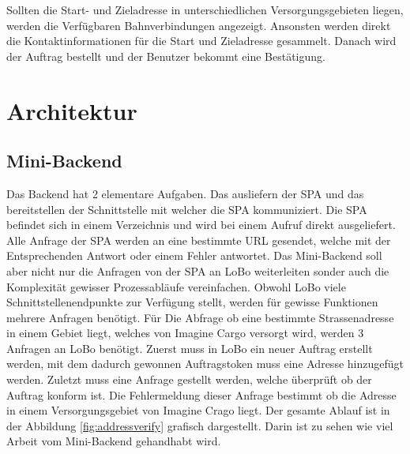 Sollten die Start- und Zieladresse in unterschiedlichen Versorgungsgebieten liegen, werden die Verfügbaren Bahnverbindungen angezeigt. Ansonsten werden direkt die Kontaktinformationen für die Start und Zieladresse gesammelt. Danach wird der Auftrag bestellt und der Benutzer bekommt eine Bestätigung.


\section{Architektur}

\subsection{Mini-Backend}
Das Backend hat 2 elementare Aufgaben. Das ausliefern der SPA und das bereitstellen der Schnittstelle mit welcher die SPA kommuniziert. Die SPA befindet sich in einem Verzeichnis und wird bei einem Aufruf direkt ausgeliefert. Alle Anfrage der SPA werden an eine bestimmte URL gesendet, welche mit der Entsprechenden Antwort oder einem Fehler antwortet. Das Mini-Backend soll aber nicht nur die Anfragen von der SPA an LoBo weiterleiten sonder auch die Komplexität gewisser Prozessabläufe vereinfachen. Obwohl LoBo viele Schnittstellenendpunkte zur Verfügung stellt, werden für gewisse Funktionen mehrere Anfragen benötigt. Für Die Abfrage ob eine bestimmte Strassenadresse in einem Gebiet liegt, welches von Imagine Cargo versorgt wird, werden 3 Anfragen an LoBo benötigt. Zuerst muss in LoBo ein neuer Auftrag erstellt werden, mit dem dadurch gewonnen Auftragstoken muss eine Adresse hinzugefügt werden. Zuletzt muss eine Anfrage gestellt werden, welche überprüft ob der Auftrag konform ist. Die Fehlermeldung dieser Anfrage bestimmt ob die Adresse in einem Versorgungsgebiet von Imagine Crago liegt. Der gesamte Ablauf ist in der Abbildung \ref{fig:addressverify} grafisch dargestellt. Darin ist zu sehen wie viel Arbeit vom Mini-Backend gehandhabt wird.


